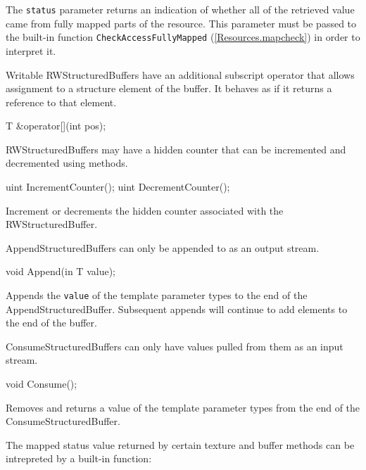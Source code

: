 The \texttt{status} parameter returns an indication of whether all of the retrieved value
came from fully mapped parts of the resource.
This parameter must be passed to the built-in function \texttt{CheckAccessFullyMapped} (\ref{Resources.mapcheck})
in order to interpret it.

Writable RWStructuredBuffers have an additional subscript operator that allows assignment to a structure element of the buffer.
It behaves as if it returns a reference to that element.
\begin{HLSL}
 T &operator[](int pos);
\end{HLSL}


RWStructuredBuffers may have a hidden counter that can be incremented and decremented using methods.

\begin{HLSL}
   uint IncrementCounter();
   uint DecrementCounter();
\end{HLSL}

Increment or decrements the hidden counter associated with the RWStructuredBuffer.


AppendStructuredBuffers can only be appended to as an output stream.

\begin{HLSL}
   void Append(in T value);
\end{HLSL}

Appends the \texttt{value} of the template parameter types to the end of the AppendStructuredBuffer.
Subsequent appends will continue to add elements to the end of the buffer.


ConsumeStructuredBuffers can only have values pulled from them as an input stream.

\begin{HLSL}
   void Consume();
\end{HLSL}

Removes and returns a value of the template parameter types from the end of the ConsumeStructuredBuffer.




The mapped status value returned by certain texture and buffer methods can be intrepreted by a built-in function:

